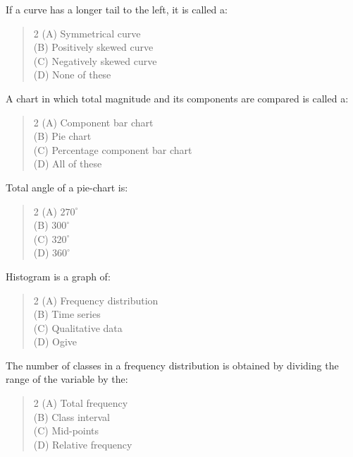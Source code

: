 \documentclass[11pt,a4paper]{article}
\begin{document}
\begin{mcqlist}
\item If a curve has a longer tail to the left, it is called a:
\begin{quote}\begin{multicols}{2}
\noindent (A) Symmetrical curve \\
(B) Positively skewed curve \\
(C) Negatively skewed curve \\
(D) None of these
\end{multicols}\end{quote}

\item A chart in which total magnitude and its components are compared is called a:
\begin{quote}\begin{multicols}{2}
\noindent (A) Component bar chart \\
(B) Pie chart \\
(C) Percentage component bar chart \\
(D) All of these
\end{multicols}\end{quote}

\item Total angle of a pie-chart is:
\begin{quote}\begin{multicols}{2}
\noindent (A) $270^\circ$ \\
(B) $300^\circ$ \\
(C) $320^\circ$ \\
(D) $360^\circ$
\end{multicols}\end{quote}

\item Histogram is a graph of:
\begin{quote}\begin{multicols}{2}
\noindent (A) Frequency distribution \\
(B) Time series \\
(C) Qualitative data \\
(D) Ogive
\end{multicols}\end{quote}

\item The number of classes in a frequency distribution is obtained by dividing the range of the variable by the:
\begin{quote}\begin{multicols}{2}
\noindent (A) Total frequency \\
(B) Class interval \\
(C) Mid-points \\
(D) Relative frequency
\end{multicols}\end{quote}


\end{mcqlist}
\end{document}
